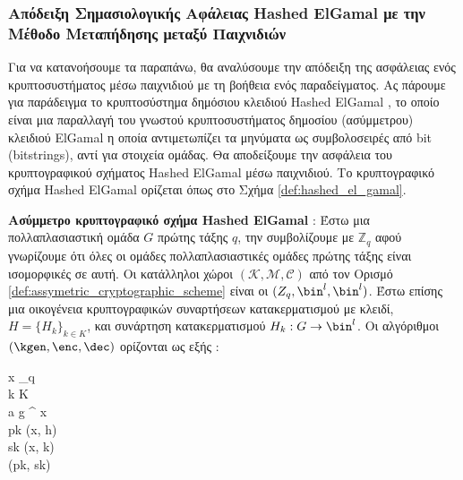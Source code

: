\subsubsection{Απόδειξη Σημασιολογικής Αφάλειας Hashed ElGamal με την Μέθοδο Μεταπήδησης μεταξύ Παιχνιδιών}

Για να κατανοήσουμε τα παραπάνω, θα αναλύσουμε την απόδειξη της ασφάλειας ενός κρυπτοσυστήματος μέσω παιχνιδιού με τη βοήθεια ενός παραδείγματος. Ας πάρουμε για παράδειγμα το κρυπτοσύστημα δημόσιου κλειδιού Hashed ElGamal \cite{cryptoeprint:2004/332}, το οποίο είναι μια παραλλαγή του γνωστού κρυπτοσυστήματος δημοσίου (ασύμμετρου) κλειδιού ElGamal η οποία αντιμετωπίζει τα μηνύματα ως συμβολοσειρές από bit (bitstrings), αντί για στοιχεία ομάδας. Θα αποδείξουμε την ασφάλεια του κρυπτογραφικού σχήματος Hashed ElGamal μέσω παιχνιδιού. Το κρυπτογραφικό σχήμα Hashed ElGamal ορίζεται όπως στο Σχήμα \ref{def:hashed_el_gamal}.

\begin{definition}
    \label{def:hashed_el_gamal}
    \textbf{Ασύμμετρο κρυπτογραφικό σχήμα Hashed ElGamal} : Έστω μια πολλαπλασιαστική ομάδα $G$ πρώτης τάξης $q$, την συμβολίζουμε με $\mathbb{Z}_q$ αφού γνωρίζουμε ότι όλες οι ομάδες πολλαπλασιαστικές ομάδες πρώτης τάξης είναι ισομορφικές σε αυτή. Οι κατάλληλοι χώροι $(\mathcal{K}, \mathcal{M}, \mathcal{C})$ από τον Ορισμό \ref{def:assymetric_cryptographic_scheme} είναι οι $(Z_q, \bin^l, \bin^l)$. Έστω επίσης μια οικογένεια κρυπτογραφικών συναρτήσεων κατακερματισμού με κλειδί, $H = \{H_k\}_{k \in K}$, και συνάρτηση κατακερματισμού $H_k : G \rightarrow \bin^l$. Οι αλγόριθμοι $(\kgen, \enc, \dec)$ ορίζονται ως εξής :
    \begin{pchstack}[center, boxed, space=1em]
        \procedure[linenumbering]{\kgen(\secparam)} {
        x \sample {}_q \\
        k \sample K \\
        a \leftarrow g ^ x \\
        pk \leftarrow (x, h) \\
        sk \leftarrow (x, k) \\
        \pcreturn (pk, sk)
        }
    \end{pchstack}
\end{definition}

